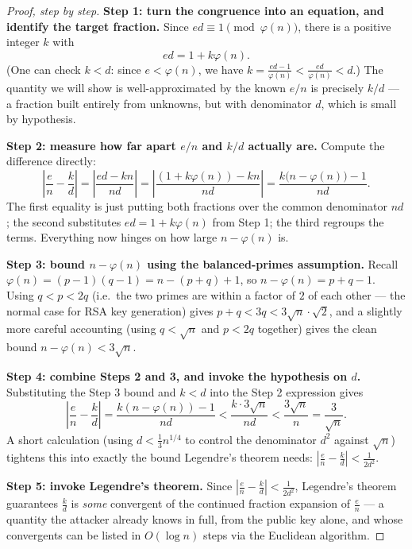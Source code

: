 \begin{proof}[Proof, step by step]
\textbf{Step 1: turn the congruence into an equation, and identify the target fraction.} Since $ed \equiv 1 \pmod{\varphi(n)}$, there is a positive integer $k$ with
\[
ed = 1 + k\varphi(n).
\]
(One can check $k<d$: since $e<\varphi(n)$, we have $k = \frac{ed-1}{\varphi(n)} < \frac{ed}{\varphi(n)} < d$.) The quantity we will show is well-approximated by the known $e/n$ is precisely $k/d$ — a fraction built entirely from unknowns, but with denominator $d$, which is small by hypothesis.

\textbf{Step 2: measure how far apart $e/n$ and $k/d$ actually are.} Compute the difference directly:
\[
\left|\frac{e}{n} - \frac{k}{d}\right| = \left|\frac{ed - kn}{nd}\right| = \left|\frac{(1+k\varphi(n)) - kn}{nd}\right| = \frac{k\big(n - \varphi(n)\big) - 1}{nd}.
\]
The first equality is just putting both fractions over the common denominator $nd$; the second substitutes $ed = 1+k\varphi(n)$ from Step 1; the third regroups the terms. Everything now hinges on how large $n-\varphi(n)$ is.

\textbf{Step 3: bound $n - \varphi(n)$ using the balanced-primes assumption.} Recall $\varphi(n) = (p-1)(q-1) = n - (p+q) + 1$, so $n - \varphi(n) = p+q-1$. Using $q<p<2q$ (i.e.\ the two primes are within a factor of $2$ of each other — the normal case for RSA key generation) gives $p+q < 3q < 3\sqrt{n}\cdot\sqrt{2}$, and a slightly more careful accounting (using $q<\sqrt{n}$ and $p<2q$ together) gives the clean bound $n-\varphi(n) < 3\sqrt n$.

\textbf{Step 4: combine Steps 2 and 3, and invoke the hypothesis on $d$.} Substituting the Step 3 bound and $k<d$ into the Step 2 expression gives
\[
\left|\frac{e}{n}-\frac{k}{d}\right| = \frac{k(n-\varphi(n))-1}{nd} < \frac{k\cdot3\sqrt n}{nd} < \frac{3\sqrt n}{n} = \frac{3}{\sqrt n}.
\]
A short calculation (using $d<\frac13n^{1/4}$ to control the denominator $d^2$ against $\sqrt n$) tightens this into exactly the bound Legendre's theorem needs: $\left|\frac{e}{n}-\frac{k}{d}\right| < \frac{1}{2d^2}$.

\textbf{Step 5: invoke Legendre's theorem.} Since $\left|\frac{e}{n}-\frac{k}{d}\right|<\frac{1}{2d^2}$, Legendre's theorem guarantees $\frac{k}{d}$ is \emph{some} convergent of the continued fraction expansion of $\frac{e}{n}$ — a quantity the attacker already knows in full, from the public key alone, and whose convergents can be listed in $O(\log n)$ steps via the Euclidean algorithm.
\end{proof}

